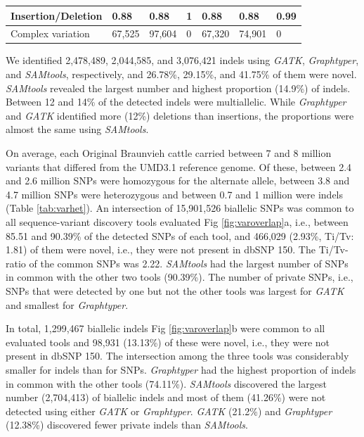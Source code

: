 \documentclass[../main.tex]{subfiles}
\begin{document}
\begin{landscape}
\begin{table}
\begin{tabular}{|l|l|l|l|l|l|l|}
    \hline
    Insertion/Deletion    & 0.88                  & 0.88                        & 1                         & 0.88                  & 0.88                        & 0.99                       \\ 
    \hline
    Complex variation     & 67,525                & 97,604                      & 0                         & 67,320                & 74,901                      & 0                          \\
    \hline
    \end{tabular}
    \label{tab:varcount}
    \end{table}
\end{landscape}

\newpage

We identified 2,478,489, 2,044,585, and 3,076,421 indels using \emph{GATK}, \emph{Graphtyper}, and \emph{SAMtools}, respectively, and 26.78\%, 29.15\%, and 41.75\% of them were novel. 
\emph{SAMtools} revealed the largest number and highest proportion (14.9\%) of indels. 
Between 12 and 14\% of the detected indels were multiallelic. 
While \emph{Graphtyper} and \emph{GATK} identified more (12\%) deletions than insertions, the proportions were almost the same using \emph{SAMtools}.

On average, each Original Braunvieh cattle carried between 7 and 8 million variants that differed from the UMD3.1 reference genome. 
Of these, between 2.4 and 2.6 million SNPs were homozygous for the alternate allele, between 3.8 and 4.7 million SNPs were heterozygous and between 0.7 and 1 million were indels (Table \ref{tab:varhet}). An intersection of 15,901,526 biallelic SNPs was common to all sequence-variant discovery tools evaluated Fig \ref{fig:varoverlap}a, i.e., between 85.51 and 90.39\% of the detected SNPs of each tool, and 466,029 (2.93\%, Ti/Tv: 1.81) of them were novel, i.e., they were not present in dbSNP 150. 
The Ti/Tv-ratio of the common SNPs was 2.22. 
\emph{SAMtools} had the largest number of SNPs in common with the other two tools (90.39\%). The number of private SNPs, i.e., SNPs that were detected by one but not the other tools was largest for \emph{GATK} and smallest for \emph{Graphtyper}.

In total, 1,299,467 biallelic indels Fig \ref{fig:varoverlap}b were common to all evaluated tools and 98,931 (13.13\%) of these were novel, 
i.e., they were not present in dbSNP 150. The intersection among the three tools was considerably smaller for indels than for SNPs. 
\emph{Graphtyper} had the highest proportion of indels in common with the other tools (74.11\%). 
\emph{SAMtools} discovered the largest number (2,704,413) of biallelic indels and most of them (41.26\%) were not detected using either \emph{GATK} or \emph{Graphtyper}. 
\emph{GATK} (21.2\%) and \emph{Graphtyper} (12.38\%) discovered fewer private indels than \emph{SAMtools}.
\end{document}
